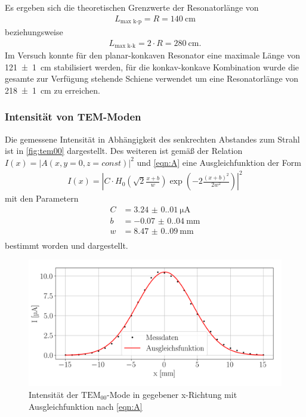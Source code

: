 Es ergeben sich die theoretischen Grenzwerte der Resonatorlänge von 
\begin{align}
    L_\text{max k-p}=R=\SI{140}{\centi\meter}
\end{align}
beziehungsweise 
\begin{align}
    L_\text{max k-k}=2\cdot R=\SI{280}{\centi\meter}\text{.}
\end{align}
Im Versuch konnte für den planar-konkaven Resonator eine maximale Länge von \SI{121(1)}{\centi\meter} stabilisiert werden, für die konkav-konkave Kombination wurde die gesamte zur Verfügung stehende Schiene verwendet um eine Resonatorlänge von \SI{218(1)}{\centi\meter} zu erreichen.
\subsubsection{Intensität von TEM-Moden}
Die gemessene Intensität in Abhängigkeit des senkrechten Abstandes zum Strahl ist in \autoref{fig:tem00} dargestellt. Des weiteren ist gemäß der Relation $I(x)=|A(x,y=0,z=const)|^2$ und \autoref{eqn:A} eine Ausgleichfunktion der Form
\begin{align}
    I(x)=\left|C\cdot H_0\left(\sqrt{2}\frac{x+b}{w}\right)\exp{\left(-2\frac{(x+b)^2}{2w^2}\right)}\right|^2
\end{align}
mit den Parametern
\begin{align}
    C &= \SI{3.24(0.01)}{\micro\ampere}\\
    b &= \SI{-0.07(0.04)}{\milli\meter}\\
    w &= \SI{8.47(0.09)}{\milli\meter}\\
\end{align}
bestimmt worden und dargestellt.
\begin{figure}[H]
    \centering
    \includegraphics[scale=0.55]{Skripte/TEM00Mode.png}
    \caption{Intensität der $\mathrm{TEM_{00}}$-Mode in gegebener x-Richtung mit Ausgleichfunktion nach \autoref{eqn:A}}\label{fig:tem00}
\end{figure}
